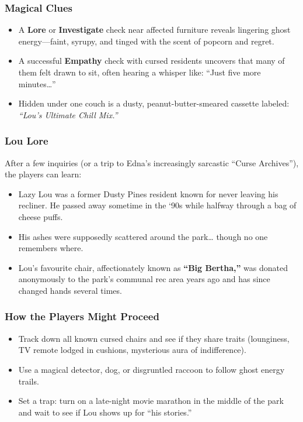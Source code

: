 \subsubsection*{Magical Clues}
\begin{itemize}
    \item A \textbf{Lore} or \textbf{Investigate}  check near affected furniture reveals lingering ghost energy—faint, syrupy, and tinged with the scent of popcorn and regret.
    \item A successful \textbf{Empathy}  check with cursed residents uncovers that many of them felt drawn to sit, often hearing a whisper like: “Just five more minutes…”
    \item Hidden under one couch is a dusty, peanut-butter-smeared cassette labeled: \textit{“Lou’s Ultimate Chill Mix.”}
\end{itemize}

\subsubsection*{Lou Lore}
After a few inquiries (or a trip to Edna’s increasingly sarcastic “Curse Archives”), the players can learn:
\begin{itemize}
    \item Lazy Lou was a former Dusty Pines resident known for never leaving his recliner. He passed away sometime in the ‘90s while halfway through a bag of cheese puffs.
    \item His ashes were supposedly scattered around the park… though no one remembers where.
    \item Lou’s favourite chair, affectionately known as \textbf{“Big Bertha,”} was donated anonymously to the park’s communal rec area years ago and has since changed hands several times.
\end{itemize}

\subsubsection*{How the Players Might Proceed}
\begin{itemize}
    \item Track down all known cursed chairs and see if they share traits (lounginess, TV remote lodged in cushions, mysterious aura of indifference).
    \item Use a magical detector, dog, or disgruntled raccoon to follow ghost energy trails.
    \item Set a trap: turn on a late-night movie marathon in the middle of the park and wait to see if Lou shows up for “his stories.”
\end{itemize}


